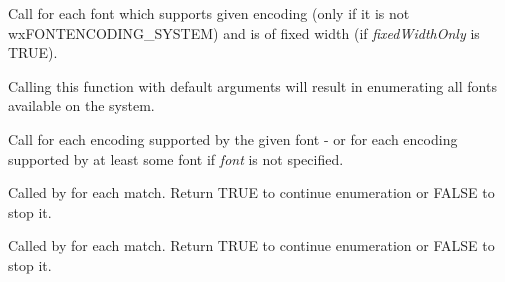 \label{wxfontenumeratorenumeratefamilies}


Call  for each font which
supports given encoding (only if it is not wxFONTENCODING\_SYSTEM) and is of
fixed width (if {\it fixedWidthOnly} is TRUE).

Calling this function with default arguments will result in enumerating all
fonts available on the system.

\label{wxfontenumeratorenumerateencodings}


Call  for each
encoding supported by the given font - or for each encoding supported by at
least some font if {\it font} is not specified.

\label{wxfontenumeratoronfontfamily}


Called by  for
each match. Return TRUE to continue enumeration or FALSE to stop it.

\label{wxfontenumeratoronfontencoding}


Called by  for
each match. Return TRUE to continue enumeration or FALSE to stop it.


